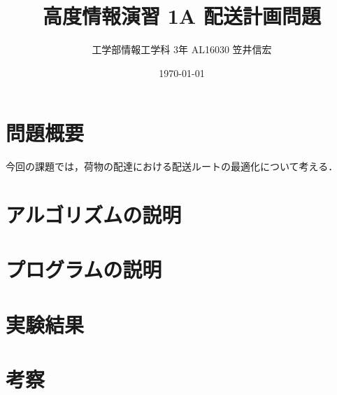 \documentclass{jsarticle}
\title{高度情報演習 1A 配送計画問題}
\author{工学部情報工学科 3年 AL16030 笠井信宏}
\date{\today}
\begin{document}
\maketitle
\newpage
\section{問題概要}
今回の課題では，荷物の配達における配送ルートの最適化について考える．


\section{アルゴリズムの説明}
\section{プログラムの説明}
\section{実験結果}
\section{考察}
\end{document}
